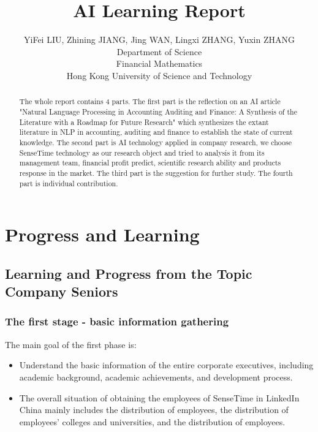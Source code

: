 \documentclass{article}
\title{AI Learning Report}
\author{%
  YiFei LIU, Zhining JIANG, Jing WAN, Lingxi ZHANG, Yuxin ZHANG \\
  Department of Science\\
  Financial Mathematics\\
  Hong Kong University of Science and Technology\\
}
\begin{document}
\maketitle

\begin{abstract}
 The whole report contains 4 parts. The first part is the reflection on an AI article "Natural Language Processing in Accounting Auditing and Finance: A Synthesis of the Literature with a Roadmap for Future Research" which synthesizes the extant literature in NLP in accounting, auditing and finance to establish the state of current knowledge. The second part is AI technology applied in company research, we choose SenseTime technology as our research object and tried to analysis it from its management team, financial profit predict, scientific research ability and products response in the market. The third part is the suggestion for further study. The fourth part is individual contribution.
\end{abstract}

\section{Progress and Learning}
\subsection{Learning and Progress from the Topic Company Seniors}
\subsubsection{The first stage - basic information gathering}
The main goal of the first phase is:
\begin{itemize}
	\item Understand the basic information of the entire corporate executives, including academic background, academic achievements, and development process.
	\item The overall situation of obtaining the employees of SenseTime in LinkedIn China mainly includes the distribution of employees, the distribution of employees' colleges and universities, and the distribution of employees.
\end{itemize}
\end{document}
